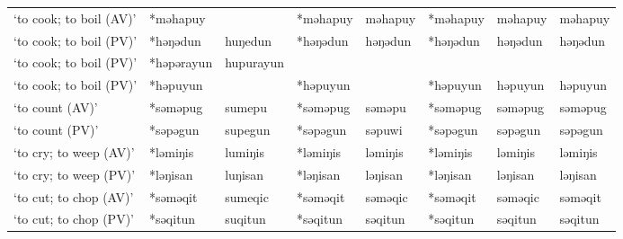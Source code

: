 \begin{landscape}
\begin{longtable}[c]{@{}p{3cm}<{\raggedright}p{2.75cm}<{\raggedright}p{2.75cm}<{\raggedright}p{2.75cm}<{\raggedright}p{2.75cm}<{\raggedright}p{2.75cm}<{\raggedright}p{2.75cm}<{\raggedright}p{2.75cm}<{\raggedright}@{}}
`to cook; to boil (AV)'                              & *məhapuy     &                               & *məhapuy       & məhapuy                    & *məhapuy         & məhapuy                  & məhapuy                           \\
`to cook; to boil (PV)'                              & *həŋədun     & huŋedun                       & *həŋədun       & həŋədun                    & *həŋədun         & həŋədun                  & həŋədun                           \\
`to cook; to boil (PV)'                              & *həpərayun   & hupurayun                     &                &                            &                  &                          &                                   \\
`to cook; to boil (PV)'                              & *həpuyun     &                               & *həpuyun       &                            & *həpuyun         & həpuyun                  & həpuyun                           \\
`to count (AV)'                                      & *səməpug     & sumepu                        & *səməpug       & səməpu                     & *səməpug         & səməpug                  & səməpug                           \\
`to count (PV)'                                      & *səpəgun     & supegun                       & *səpəgun       & səpuwi                     & *səpəgun         & səpəgun                  & səpəgun                           \\
`to cry; to weep (AV)'                               & *ləmiŋis     & lumiŋis                       & *ləmiŋis       & ləmiŋis                    & *ləmiŋis         & ləmiŋis                  & ləmiŋis                           \\
`to cry; to weep (PV)'                               & *ləŋisan     & luŋisan                       & *ləŋisan       & ləŋisan                    & *ləŋisan         & ləŋisan                  & ləŋisan                           \\
`to cut; to chop (AV)'                               & *səməqit     & sumeqic                       & *səməqit       & səməqic                    & *səməqit         & səməqic                  & səməqit                           \\
`to cut; to chop (PV)'                               & *səqitun     & suqitun                       & *səqitun       & səqitun                    & *səqitun         & səqitun                  & səqitun                           \\

\end{longtable}
\end{landscape}
